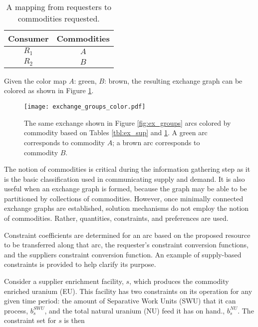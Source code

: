 \begin{table}[h]
\centering
\begin{tabular}{c|c}
Consumer & Commodities \\ \hline
$R_1$             & $A$         \\
$R_2$             & $B$        
\end{tabular}
\caption{A mapping from requesters to commodities requested.}
\label{tbl:ex_req}
\end{table}

Given the color map $A$: green, $B$: brown, the resulting exchange
graph can be colored as shown in Figure \ref{fig:ex_groups_color}.

\begin{figure}
  \begin{center}
    \texttt{[image: exchange\_groups\_color.pdf]}
    \caption{The same exchange shown in Figure \ref{fig:ex_groups} arcs colored
      by commodity based on Tables \ref{tbl:ex_sup} and \ref{tbl:ex_req}. A green
      arc corresponds to commodity $A$; a brown arc corresponds to commodity
      $B$.}
    \label{fig:ex_groups_color}
  \end{center}
\end{figure}

The notion of commodities is critical during the information gathering step as
it is the basic classification used in communicating supply and demand. It is
also useful when an exchange graph is formed, because the graph may be able to
be partitioned by collections of commodities. However, once minimally connected
exchange graphs are established, solution mechanisms do not employ the notion of
commodities. Rather, quantities, constraints, and preferences are used.


Constraint coefficients are determined for an arc based on the proposed resource
to be transferred along that arc, the requester's constraint conversion
functions, and the suppliers constraint conversion function. An example of
supply-based constraints is provided to help clarify its purpose.

Consider a supplier enrichment facility, $s$, which produces the commodity
enriched uranium (EU). This facility has two constraints on its operation for
any given time period: the amount of Separative Work Units (SWU) that it can
process, $b_{s}^{SWU}$, and the total natural uranium (NU) feed it has on hand.,
$b_{s}^{NU}$. The constraint set for $s$ is then
 
